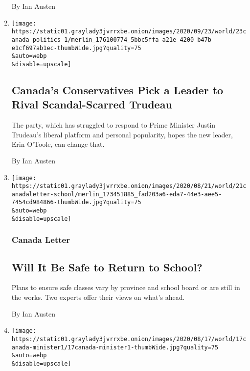 \begin{enumerate}
  By Ian Austen
\item
  \href{/2020/08/23/world/canada/canada-conservatives-trudeau-leader.html}{}

  \texttt{[image: https://static01.graylady3jvrrxbe.onion/images/2020/09/23/world/23canada-politics-1/merlin\_176100774\_5bbc5ffa-a21e-4200-b47b-e1cf697ab1ec-thumbWide.jpg?quality=75\\\&auto=webp\\\&disable=upscale]}

  \hypertarget{canadas-conservatives-pick-a-leader-to-rival-scandal-scarred-trudeau}{%
  \subsection{Canada's Conservatives Pick a Leader to Rival
  Scandal-Scarred
  Trudeau}\label{canadas-conservatives-pick-a-leader-to-rival-scandal-scarred-trudeau}}

  The party, which has struggled to respond to Prime Minister Justin
  Trudeau's liberal platform and personal popularity, hopes the new
  leader, Erin O'Toole, can change that.

  By Ian Austen
\item
  \href{/2020/08/21/world/canada/will-it-be-safe-to-return-to-school.html}{}

  \texttt{[image: https://static01.graylady3jvrrxbe.onion/images/2020/08/21/world/21canadaletter-school/merlin\_173451885\_fad203a6-eda7-44e3-aee5-7454cd984866-thumbWide.jpg?quality=75\\\&auto=webp\\\&disable=upscale]}

  \hypertarget{canada-letter-2}{%
  \subsubsection{Canada Letter}\label{canada-letter-2}}

  \hypertarget{will-it-be-safe-to-return-to-school}{%
  \subsection{Will It Be Safe to Return to
  School?}\label{will-it-be-safe-to-return-to-school}}

  Plans to ensure safe classes vary by province and school board or are
  still in the works. Two experts offer their views on what's ahead.

  By Ian Austen
\item
  \href{/2020/08/17/world/canada/finance-minister-resigns-trudeau.html}{}

  \texttt{[image: https://static01.graylady3jvrrxbe.onion/images/2020/08/17/world/17canada-minister1/17canada-minister1-thumbWide.jpg?quality=75\\\&auto=webp\\\&disable=upscale]}


\end{enumerate}
